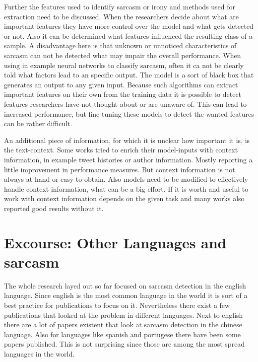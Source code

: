 \documentclass[sigconf,  review=false, nonacm=true]{acmart}
\begin{document}
Further the features used to identify sarcasm or irony and methods used for extraction need to be discussed. When the researchers decide about what are important features they have more control over the model and what gets detected or not. Also it can be determined what features influenced the resulting class of a sample. A disadvantage here is that unknown or unnoticed characteristics of sarcasm can not be detected what may impair the overall performance.
When using in example neural networks to classify sarcasm, often it ca not be clearly told what factors lead to an specific output. The model is a sort of black box that generates an output to any given input. Because such algorithms can extract important features on their own from the training data it is possible to detect features researchers have not thought about or are unaware of. This can lead to increased performance, but fine-tuning these models to detect the wanted features can be rather difficult.

An additional piece of information, for which it is unclear how important it is, is the text-context. Some works tried to enrich their model-inputs with context information, in example tweet histories or author information. Mostly reporting a little improvement in performance measures. But context information is not always at hand or easy to obtain. Also models need to be modified to effectively handle context information, what can be a big effort. If it is worth and useful to work with context information depends on the given task and many works also reported good results without it.


\section{Excourse: Other Languages and sarcasm}

The whole research layed out so far focused on sarcasm detection in the english language. Since english is the most common language in the world it is sort of a best practice for publications to focus on it. Nevertheless there exist a few publications that looked at the problem in different languages. Next to english there are a lot of papers existent that look at sarcasm detection in the chinese language. Also for languages like spanish and portugese there have been some papers published. This is not surprising since those are among the most spread languages in the world.
\end{document}
